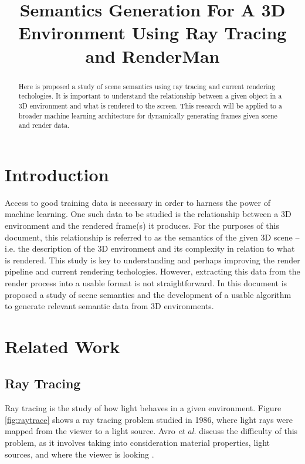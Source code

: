 \documentclass[conference]{IEEEtran}
\begin{document}
\title{Semantics Generation For A 3D Environment Using Ray Tracing and RenderMan}

\author{
}

\maketitle

\begin{abstract}
Here is proposed a study of scene semantics
using ray tracing and current rendering techologies.
It is important to understand the relationship between
a given object in a 3D environment and what is rendered to
the screen.
This research will be applied to a broader machine learning
architecture for dynamically generating frames
given scene and render data.
\end{abstract}

\section{Introduction}
\label{sec:introduction}
Access to good training data is necessary
in order to harness the power of machine learning.
One such data to be studied is the relationship
between a 3D environment and the
rendered frame(s) it produces.
For the purposes of this document, this relationship is
referred to as the semantics of the given 3D scene --
i.e. the description of the 3D environment and its complexity
in relation to what is rendered.
This study is key to understanding and perhaps improving the
render pipeline and current rendering techologies.
However, extracting this data from the render process into a usable
format is not straightforward.
In this document is proposed a study of scene semantics and the development of a
usable algorithm to generate relevant semantic data from 3D environments.

\section{Related Work}
\label{sec:related_work}
\subsection{Ray Tracing}
Ray tracing is the study of how light behaves in a given environment.
Figure \ref{fig:raytrace}
shows a ray tracing problem studied in 1986, where light rays were mapped from
the viewer to a light source. Avro \textit{et al.}
discuss the difficulty of this problem,
as it involves taking into consideration material properties, light sources,
and where the viewer is looking \cite{backwards_raytrace}.
\end{document}
